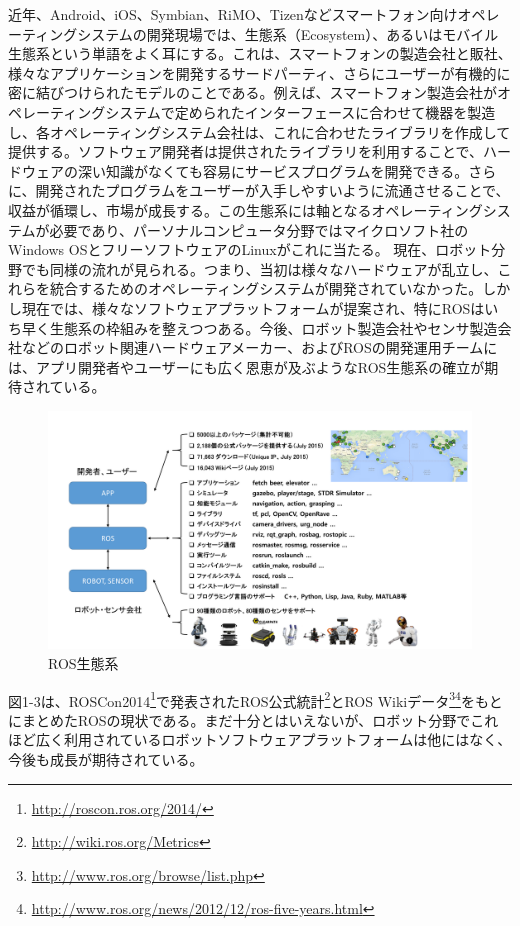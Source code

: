 近年、Android、iOS、Symbian、RiMO、Tizenなどスマートフォン向けオペレーティングシステムの開発現場では、生態系（Ecosystem）、あるいはモバイル生態系という単語をよく耳にする。これは、スマートフォンの製造会社と販社、様々なアプリケーションを開発するサードパーティ、さらにユーザーが有機的に密に結びつけられたモデルのことである。例えば、スマートフォン製造会社がオペレーティングシステムで定められたインターフェースに合わせて機器を製造し、各オペレーティングシステム会社は、これに合わせたライブラリを作成して提供する。ソフトウェア開発者は提供されたライブラリを利用することで、ハードウェアの深い知識がなくても容易にサービスプログラムを開発できる。さらに、開発されたプログラムをユーザーが入手しやすいように流通させることで、収益が循環し、市場が成長する。この生態系には軸となるオペレーティングシステムが必要であり、パーソナルコンピュータ分野ではマイクロソフト社のWindows OSとフリーソフトウェアのLinuxがこれに当たる。
現在、ロボット分野でも同様の流れが見られる。つまり、当初は様々なハードウェアが乱立し、これらを統合するためのオペレーティングシステムが開発されていなかった。しかし現在では、様々なソフトウェアプラットフォームが提案され、特にROSはいち早く生態系の枠組みを整えつつある。今後、ロボット製造会社やセンサ製造会社などのロボット関連ハードウェアメーカー、およびROSの開発運用チームには、アプリ開発者やユーザーにも広く恩恵が及ぶようなROS生態系の確立が期待されている。

\begin{figure}[h]
  \centering
  \includegraphics[width=\columnwidth]{pictures/chapter1/pic_01_03.png}
  \caption{ROS生態系}
\end{figure}

図1-3は、ROSCon2014\footnote{\url{http://roscon.ros.org/2014/}}で発表されたROS公式統計\footnote{\url{http://wiki.ros.org/Metrics}}とROS Wikiデータ\footnote{\url{http://www.ros.org/browse/list.php}}\footnote{\url{http://www.ros.org/news/2012/12/ros-five-years.html}}をもとにまとめたROSの現状である。まだ十分とはいえないが、ロボット分野でこれほど広く利用されているロボットソフトウェアプラットフォームは他にはなく、今後も成長が期待されている。

